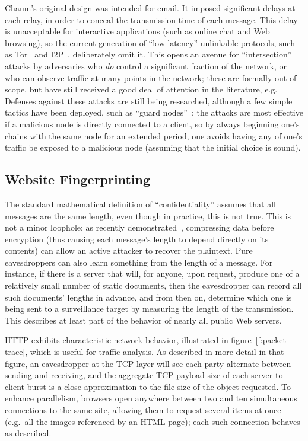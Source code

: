 \documentclass[tinymargin]{zarticle}
\begin{document}
Chaum's original design was intended for email. It imposed significant
delays at each relay, in order to conceal the transmission time of
each message.  This delay is unacceptable for interactive applications
(such as online chat and Web browsing), so the current generation of
“low latency” unlinkable protocols, such as
Tor~\cite{dingledine2004tor} and I2P~\cite{i2p.undated.i2p},
deliberately omit it.  This opens an avenue for “intersection” attacks
by adversaries who \emph{do} control a significant fraction of the
network, or who can observe traffic at many points in the network;
these are formally out of scope, but have still received a good deal
of attention in the literature, e.g.~\cite{danezis2003statistical,
  danezis2004continuous, danezis2005statistical, danezis2007twosided,
  murdoch2007sampled, shmatikov2006timing, overlier2006locating}
Defenses against these attacks are still being researched, although a
few simple tactics have been deployed, such as “guard
nodes”~\cite{overlier2006locating}: the attacks are most effective if
a malicious node is directly connected to a client, so by always
beginning one's chains with the same node for an extended period, one
avoids having any of one's traffic be exposed to a malicious node
(assuming that the initial choice is sound).

\subsection{Website Fingerprinting}



The standard mathematical definition of “confidentiality” assumes that
all messages are the same length, even though in practice, this is not
true.  This is not a minor loophole; as recently
demonstrated~\cite{duong2012crime,gluck2013breach}, compressing data
before encryption (thus causing each message's length to depend
directly on its contents) can allow an active attacker to recover the
plaintext.  Pure eavesdroppers can also learn something from the
length of a message.  For instance, if there is a server that will,
for anyone, upon request, produce one of a relatively small number of
static documents, then the eavesdropper can record all such documents'
lengths in advance, and from then on, determine which one is being
sent to a surveillance target by measuring the length of the
transmission.  This describes at least part of the behavior of nearly
all public Web servers.

HTTP exhibits characteristic network behavior, illustrated in
figure~\ref{f:packet-trace}, which is useful for traffic analysis.  As
described in more detail in that figure, an eavesdropper at the TCP
layer will see each party alternate between sending and receiving, and
the aggregate TCP payload size of each server-to-client burst is a
close approximation to the file size of the object requested.  To
enhance parallelism, browsers open anywhere between two and ten
simultaneous connections to the same site, allowing them to request
several items at once (e.g.\ all the images referenced by an HTML
page); each such connection behaves as described.
\end{document}
